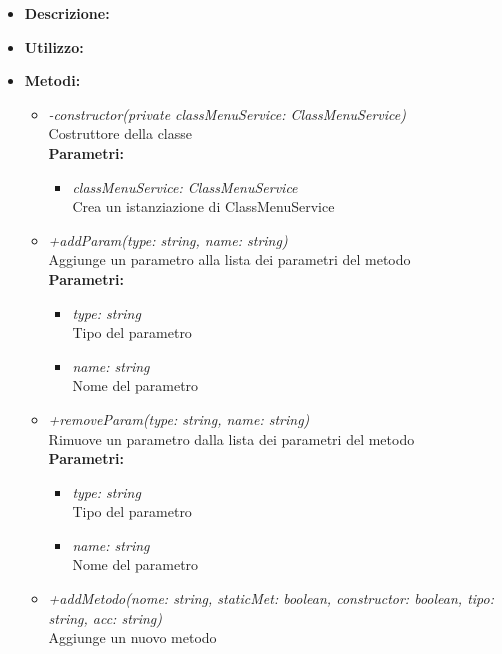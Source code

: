 \begin{itemize}
	\item \textbf{Descrizione:}\\
	
	\item \textbf{Utilizzo:}\\
	
	\item \textbf{Metodi:}
		\begin{itemize}
			\item \emph{-constructor(private classMenuService: ClassMenuService)}\\
    		Costruttore della classe\\
    		\textbf{Parametri:}
    		\begin{itemize}
    			\item \emph{classMenuService: ClassMenuService}\\
    			Crea un istanziazione di ClassMenuService
    		\end{itemize}
    		\item \emph{+addParam(type: string, name: string)}\\
    		Aggiunge un parametro alla lista dei parametri del metodo\\
    		\textbf{Parametri:}
    		\begin{itemize}
    			\item \emph{type: string}\\
    			Tipo del parametro
    			\item \emph{name: string}\\
    			Nome del parametro
    		\end{itemize}
    		\item \emph{+removeParam(type: string, name: string)}\\
    		Rimuove un parametro dalla lista dei parametri del metodo\\
    		\textbf{Parametri:}
    		\begin{itemize}
    			\item \emph{type: string}\\
    			Tipo del parametro
    			\item \emph{name: string}\\
    			Nome del parametro
    		\end{itemize}
    		\item \emph{+addMetodo(nome: string, staticMet: boolean, constructor: boolean, tipo: string, acc: string)}\\
    		Aggiunge un nuovo metodo\\

\end{itemize}
\end{itemize}
